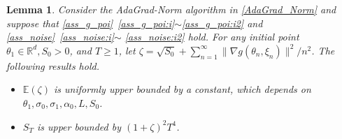 \documentclass[standalone]{article}
\newcommand{\E}{\mathbb{E}}
\newtheorem{lem}{Lemma}[section]
\begin{document}
\begin{lem}\label{lem_S_{T}} 
Consider the AdaGrad-Norm algorithm in  \cref{AdaGrad_Norm} and suppose that   \cref{ass_g_poi}~\ref{ass_g_poi:i}$\sim$\ref{ass_g_poi:i2} and  \cref{ass_noise}~\ref{ass_noise:i}$\sim$ \ref{ass_noise:i2} hold. For any initial point $\theta_{1}\in \mathbb{R}^{d}, S_{0}>0$, and $T \geq 1$, let $\zeta =\sqrt{S_{0}}+\sum_{n=1}^{\infty}\|\nabla g(\theta_{n},\xi_{n})\|^{2}/n^2$. The following results hold.
\begin{itemize}
\item[(a)]  $\E(\zeta)$ is uniformly upper bounded by a constant, which depends on $\theta_1, \sigma_0, \sigma_1, \alpha_0,  L, S_0$.
\item[(b)] $S_T$ is upper bounded by $(1+\zeta)^2T^4$.
\end{itemize}
\end{lem}
\end{document}
